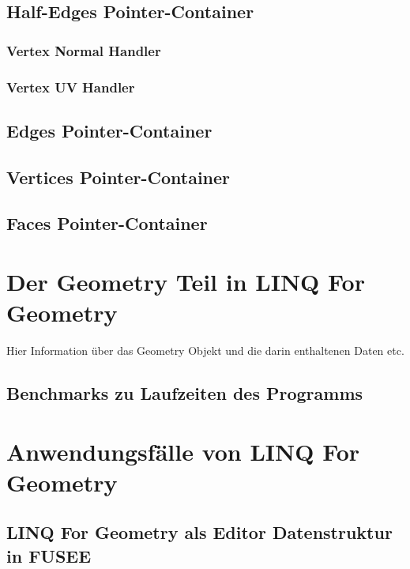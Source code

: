 \documentclass[12pt,a4paper]{scrreprt}
\newcommand{\LFGS}{LINQ For Geometry }
\begin{document}
		\subsection {Half-Edges Pointer-Container}

			\subsubsection {Vertex Normal Handler}
			
			\subsubsection {Vertex UV Handler}

		\subsection {Edges Pointer-Container}

		\subsection {Vertices Pointer-Container}

		\subsection {Faces Pointer-Container}

	\section {Der Geometry Teil in LINQ For Geometry}
			Hier Information über das Geometry Objekt und die darin enthaltenen Daten etc.
		\subsection {Benchmarks zu Laufzeiten des Programms}
	\section {Anwendungsfälle von LINQ For Geometry}
		\subsection {\LFGS als Editor Datenstruktur in FUSEE}
\end{document}
